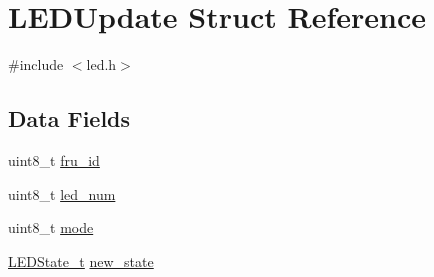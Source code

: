 \hypertarget{structLEDUpdate}{\section{L\-E\-D\-Update Struct Reference}
\label{structLEDUpdate}
}


{\ttfamily \#include $<$led.\-h$>$}

\subsection*{Data Fields}
\begin{DoxyCompactItemize}
\item 
uint8\-\_\-t \hyperlink{structLEDUpdate_ac4d77b89c3a28822b37bf6bb6a236f90}{fru\-\_\-id}
\item 
uint8\-\_\-t \hyperlink{structLEDUpdate_abdb660f38389b489270c6c2ecdbfb1e9}{led\-\_\-num}
\item 
uint8\-\_\-t \hyperlink{structLEDUpdate_a8760f2c925c2634a4e057379e62a9d87}{mode}
\item 
\hyperlink{structLEDState__t}{L\-E\-D\-State\-\_\-t} \hyperlink{structLEDUpdate_a75c77e31f8b621e98f247830fefd6926}{new\-\_\-state}
\end{DoxyCompactItemize}


